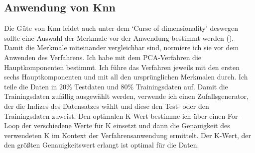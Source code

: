 \documentclass[envcountsame, envcountchap, deutsch]{i-studis}
\begin{document}
\subsection{Anwendung von Knn}
Die Güte von Knn leidet auch unter dem `Curse of dimensionality' deswegen sollte eine Auswahl der Merkmale vor der Anwendung bestimmt werden (\cite{6065061}).
Damit die Merkmale miteinander vergleichbar sind, normiere ich sie vor dem Anwenden des Verfahrens. Ich habe mit dem PCA-Verfahren die Hauptkomponenten bestimmt. Ich führe das Verfahren jeweils mit den ersten sechs Hauptkomponenten und mit all den ursprünglichen Merkmalen 
durch. Ich teile die Daten in $20\%$ Testdaten und $80\%$ Trainingsdaten auf. Damit die Trainingsdaten zufällig ausgewählt werden, verwende ich einen
Zufallsgenerator, der die Indizes des Datensatzes wählt und diese den Test- oder den Trainingsdaten zuweist. Den optimalen K-Wert bestimme ich
über einen For-Loop der verschiedene Werte für K einsetzt und dann die Genauigkeit des verwendeten K im Kontext der Verfahrensanwendung ermittelt.
Der K-Wert, der den größten Genauigkeitswert erlangt ist optimal für die Daten.
\end{document}
